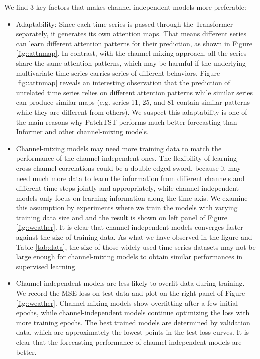 \documentclass{article} \usepackage{iclr2023_conference,times}
\begin{document}
We find 3 key factors that makes channel-independent models more preferable:

\begin{itemize}[leftmargin= 20 pt,itemsep= 5 pt,topsep = 5 pt]
    \item Adaptability: Since each time series is passed through the Transformer separately, it generates its own attention maps. That means different series can learn different attention patterns for their prediction, as shown in Figure \ref{fig::attnmap}. In contrast, with the channel mixing approach, all the series share the same attention patterns, which may be harmful if the underlying multivariate time series carries series of different behaviors. Figure \ref{fig::attnmap} reveals an interesting observation that the prediction of unrelated time series relies on different attention patterns while similar series can produce similar maps (e.g. series 11, 25, and 81 contain similar patterns while they are different from others). We suspect this adaptability is one of the main reasons why PatchTST performs much better forecasting than Informer and other channel-mixing models.

    \item Channel-mixing models may need more training data to match the performance of the channel-independent ones. The flexibility of learning cross-channel correlations could be a double-edged sword, because it may need much more data to learn the information from different channels and different time steps jointly and appropriately, while channel-independent models only focus on learning information along the time axis. We examine this assumption by experiments where we train the models with varying training data size and  and the result is shown on left panel of Figure \ref{fig::weather}.  It is clear that channel-independent models converges faster against the size of training data. As what we have observed in the figure and Table \ref{tab:data}, the size of those widely used time series datasets may not be large enough for channel-mixing models to obtain similar performances in supervised learning.
    
    \item Channel-independent models are less likely to overfit data during training. We record the MSE loss on test data and plot on the right panel of Figure \ref{fig::weather}. Channel-mixing models show overfitting after a few initial epochs, while channel-independent models continue optimizing the loss with more training epochs. The best trained models are determined by validation data, which are approximately the lowest points in the test loss curves. It is clear that the forecasting performance of channel-independent models are better. 
\end{itemize}
\end{document}
